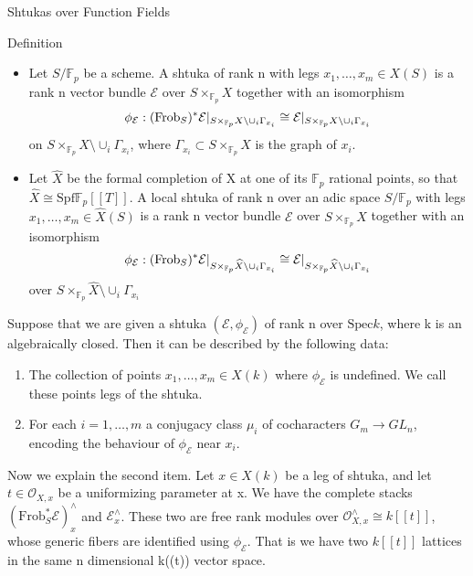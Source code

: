 \documentclass[aspectratio=1610]{ctexbeamer}
\def  \Frob     {\mathrm{Frob}}
\def  \Spec     {\mathrm{Spec}}
\def  \Spf      {\mathrm{Spf}}
\def  \ce       {\mathcal{E}}
\def  \co       {\mathcal{O}}
\def  \bF       {\mathbb{F}}
\begin{document}
\begin{frame}{Shtukas over Function Fields}

\begin{block}{Definition}
	\begin{itemize}
		\item 	Let $S/ \bF_p$ be a scheme. A shtuka of rank n with legs $x_1, \dots, x_m \in X(S)$ is a rank n vector bundle $\ce$ over $S \times_{\bF_p} X$ together with an isomorphism
		$$
		\phi_{\mathcal{E}}: (\Frob_S \time 1)^{*}  \ce |_{S \times_{\bF_p}X  \setminus \cup_i \Gamma_{x_i}}  \cong \ce |_{S \times_{\bF_p}X  \setminus \cup_i \Gamma_{x_i}}
		$$
		on $S \times_{\bF_p} X \setminus \cup_i \Gamma_{x_i}$, where $\Gamma_{x_i} \subset S \times_{\bF_p} X$ is the graph of $x_i$.
		
		
		\item Let $\widehat{X}$ be the formal completion of X  at one of its $\bF_p$ rational points, so that $\widehat{X}  \cong \Spf \bF_p [\![T]\!]$. 	A local shtuka of rank n over an adic space $S/ \bF_p$ with legs $x_1, \dots, x_m  \in \widehat{X}(S)$ is a rank n vector bundle $\ce$ over $S \times_{\bF_p}  \widehat{X}$ together with an isomorphism
		$$
		\phi_{\mathcal{E}}: (\Frob_S \time 1)^{*}  \ce |_{S \times_{\bF_p}\widehat{X}  \setminus \cup_i \Gamma_{x_i}}  \cong \ce |_{S \times_{\bF_p}\widehat{X}  \setminus \cup_i \Gamma_{x_i}}
		$$
		over $S \times_{\bF_p} \widehat{X} \setminus \cup_i \Gamma_{x_i}$
	\end{itemize}
\end{block}
\end{frame}




\begin{frame}

Suppose that we  are given a shtuka $(\ce, \phi_{\ce})$ of rank n over $\Spec k$, where k is an algebraically closed. Then it can be described by the following data:
\begin{enumerate}
	\item  The collection of points $x_1, \dots, x_m \in X(k)$ where $\phi_{\ce}$ is undefined. We call these points legs of the shtuka.
	\item For each $i=1, \dots, m$ a conjugacy class $\mu_i$ of cocharacters $G_m \to GL_n$, encoding the behaviour of $\phi_{\ce}$ near $x_i$.
\end{enumerate}


Now  we explain the second  item. Let $x \in X(k)$ be  a leg of shtuka, and let $t \in \co_{X,x}$ be a uniformizing  parameter at x. We have the complete stacks $(\Frob_S^* \ce)^{\wedge}_x$ and  $\ce^{\wedge}_x$. These two are free rank modules over $\co^{\wedge}_{X,x} \cong k[\![t]\!]$, whose generic fibers are identified  using $\phi_{\ce}$.  That is we have two $k[\![t]\!]$ lattices in the same n dimensional k((t)) vector space.
\end{frame}
\end{document}
